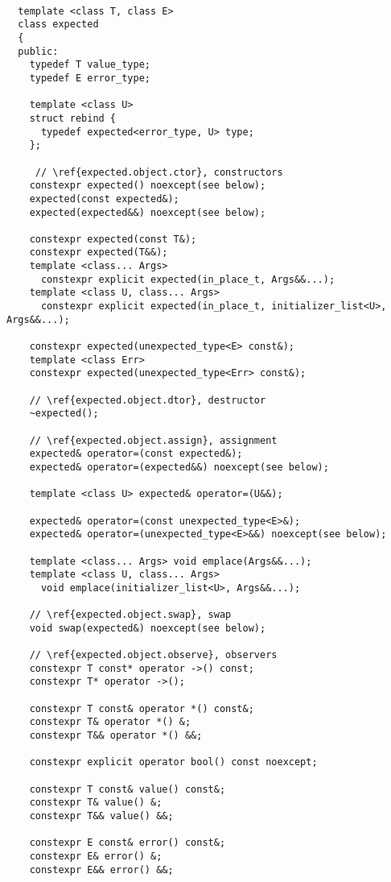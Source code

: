 \documentclass[a4paper,10pt]{article}
\begin{document}
\begin{lstlisting}

  template <class T, class E>
  class expected
  {
  public:
    typedef T value_type;
    typedef E error_type;
    
    template <class U>
    struct rebind {
      typedef expected<error_type, U> type;
    };
    
     // \ref{expected.object.ctor}, constructors
    constexpr expected() noexcept(see below);
    expected(const expected&);
    expected(expected&&) noexcept(see below);
    
    constexpr expected(const T&);
    constexpr expected(T&&);
    template <class... Args> 
      constexpr explicit expected(in_place_t, Args&&...);     
    template <class U, class... Args>
      constexpr explicit expected(in_place_t, initializer_list<U>, Args&&...);
      
    constexpr expected(unexpected_type<E> const&);
    template <class Err> 
    constexpr expected(unexpected_type<Err> const&);

    // \ref{expected.object.dtor}, destructor
    ~expected();

    // \ref{expected.object.assign}, assignment
    expected& operator=(const expected&);
    expected& operator=(expected&&) noexcept(see below);
    
    template <class U> expected& operator=(U&&);
    
    expected& operator=(const unexpected_type<E>&);
    expected& operator=(unexpected_type<E>&&) noexcept(see below);
    
    template <class... Args> void emplace(Args&&...);
    template <class U, class... Args>
      void emplace(initializer_list<U>, Args&&...);

    // \ref{expected.object.swap}, swap
    void swap(expected&) noexcept(see below);

    // \ref{expected.object.observe}, observers
    constexpr T const* operator ->() const;
    constexpr T* operator ->();
    
    constexpr T const& operator *() const&;
    constexpr T& operator *() &;
    constexpr T&& operator *() &&;
    
    constexpr explicit operator bool() const noexcept;
    
    constexpr T const& value() const&;
    constexpr T& value() &;
    constexpr T&& value() &&;
    
    constexpr E const& error() const&;
    constexpr E& error() &;
    constexpr E&& error() &&;
    

\end{lstlisting}
\end{document}
